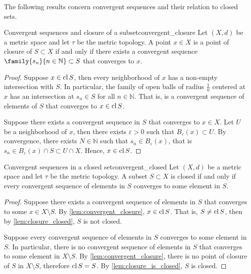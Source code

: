 The following results concern convergent sequences and their relation to closed sets.
\begin{lemma}{Convergent sequences and closure of a subset}{convergent_closure}
    Let \((X, d)\) be a metric space and let \(\tau\) be the metric topology. A point \(x \in X\) is a point of closure of \(S \subset X\) if and only if there exists a convergent sequence \(\family{s_n}{n\in \mathbb{N}}\subset S\) that converges to \(x\).
\end{lemma}
\begin{proof}
    Suppose \(x \in \operatorname{cl} S\), then every neighborhood of \(x\) has a non-empty intersection with \(S\). In particular, the family of open balls of radius \(\frac1{n}\) centered at \(x\) has an intersection at \(s_n \in S\) for all \(n \in \mathbb{N}\). That is,  is a convergent sequence of elements of \(S\) that converges to \(x \in \operatorname{cl} S\).

    Suppose there exists a convergent sequence  in \(S\) that converges to \(x \in X\). Let \(U\) be a neighborhood of \(x\), then there exists \(\varepsilon > 0\) such that \(B_\varepsilon(x) \subset U\). By convergence, there exists \(N \in \mathbb{N}\) such that \(s_n \in B_{\varepsilon}(x)\), that is \(s_n \in B_{\varepsilon}(x) \cap S \subset U \cap X\). Hence, \(x \in \operatorname{cl} S\).
\end{proof}

\begin{theorem}{Convergent sequences in a closed set}{convergent_closed}
    Let \((X, d)\) be a metric space and let \(\tau\) be the metric topology. A subset \(S \subset X\) is closed if and only if every convergent sequence of elements in \(S\) converges to some element in \(S\).
\end{theorem}
\begin{proof}
    Suppose there exists a convergent sequence of elements in \(S\) that converges to some \(x \in X \setminus S\). By \cref{lem:convergent_closure}, \(x \in \operatorname{cl} S\). That is, \(S \neq \operatorname{cl} S\), then by \cref{lem:closure_closed}, \(S\) is not closed.

    Suppose every convergent sequence of elements in \(S\) converges to some element in \(S\). In particular, there is no convergent sequence of elements in \(S\) that converges to some element in \(X \setminus S\). By \cref{lem:convergent_closure}, there is no point of closure of \(S\) in \(X \setminus S\), therefore \(\operatorname{cl} S = S\). By \cref{lem:closure_is_closed}, \(S\) is closed.
\end{proof}

